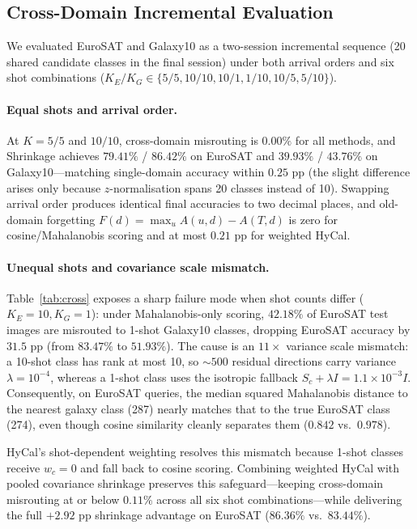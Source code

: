 \documentclass[letterpaper]{article} %
\begin{document}
\subsection{Cross-Domain Incremental Evaluation}

We evaluated EuroSAT and Galaxy10 as a two-session incremental sequence (20 shared candidate classes in the final session) under both arrival orders and six shot combinations ($K_E / K_G \in \{5/5, 10/10, 10/1, 1/10, 10/5, 5/10\}$).

\paragraph{Equal shots and arrival order.}
At $K = 5/5$ and $10/10$, cross-domain misrouting is $0.00\%$ for all methods, and Shrinkage achieves $79.41\%$ / $86.42\%$ on EuroSAT and $39.93\%$ / $43.76\%$ on Galaxy10---matching single-domain accuracy within $0.25$ pp (the slight difference arises only because $z$-normalisation spans 20 classes instead of 10). Swapping arrival order produces identical final accuracies to two decimal places, and old-domain forgetting $F(d) = \max_u A(u, d) - A(T, d)$ is zero for cosine/Mahalanobis scoring and at most $0.21$ pp for weighted HyCal.

\paragraph{Unequal shots and covariance scale mismatch.}
Table~\ref{tab:cross} exposes a sharp failure mode when shot counts differ ($K_E = 10, K_G = 1$): under Mahalanobis-only scoring, $42.18\%$ of EuroSAT test images are misrouted to 1-shot Galaxy10 classes, dropping EuroSAT accuracy by $31.5$ pp (from $83.47\%$ to $51.93\%$). The cause is an $11\times$ variance scale mismatch: a 10-shot class has rank at most 10, so $\sim 500$ residual directions carry variance $\lambda = 10^{-4}$, whereas a 1-shot class uses the isotropic fallback $S_c + \lambda I = 1.1 \times 10^{-3} I$. Consequently, on EuroSAT queries, the median squared Mahalanobis distance to the nearest galaxy class (287) nearly matches that to the true EuroSAT class (274), even though cosine similarity cleanly separates them ($0.842$ vs.\ $0.978$).

HyCal's shot-dependent weighting resolves this mismatch because 1-shot classes receive $w_c = 0$ and fall back to cosine scoring. Combining weighted HyCal with pooled covariance shrinkage preserves this safeguard---keeping cross-domain misrouting at or below $0.11\%$ across all six shot combinations---while delivering the full $+2.92$ pp shrinkage advantage on EuroSAT ($86.36\%$ vs.\ $83.44\%$).
\end{document}
